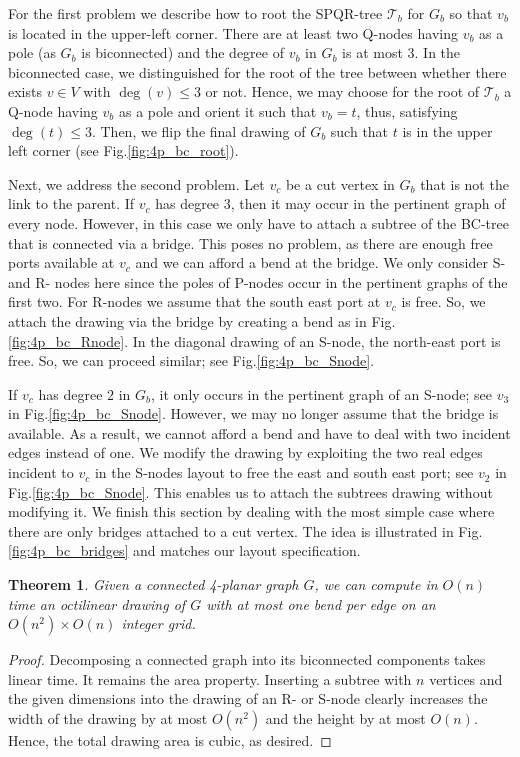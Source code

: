 \documentclass[a4paper,twoside,11pt]{article}
\newtheorem{theorem}{Theorem}
\begin{document}
For the first problem we describe how to root the SPQR-tree
$\mathcal{T}_b$ for $G_b$ so that $v_b$ is located in the upper-left
corner. There are at least two Q-nodes having $v_b$ as a pole (as
$G_b$ is biconnected) and the degree of $v_b$ in $G_b$ is at most
$3$. In the biconnected case, we distinguished for the root of the
tree between whether there exists $v \in V$ with $\deg(v) \leq 3$ or
not. Hence, we may choose for the root of $\mathcal{T}_b$ a Q-node
having $v_b$ as a pole and orient it such that $v_b = t$, thus,
satisfying $\deg(t) \leq 3$. Then, we flip the final drawing of
$G_b$ such that $t$ is in the upper left corner (see
Fig.\ref{fig:4p_bc_root}).

Next, we address the second problem. Let $v_c$ be a cut vertex in
$G_b$ that is not the link to the parent. If $v_c$ has degree $3$,
then it may occur in the pertinent graph of every node. However, in
this case we only have to attach a subtree of the BC-tree that is
connected via a bridge. This poses no problem, as there are enough
free ports available at $v_c$ and we can afford a bend at the
bridge. We only consider S- and R- nodes here since the poles of
P-nodes occur in the pertinent graphs of the first two. For R-nodes
we assume that the south east port at $v_c$ is free. So, we attach
the drawing via the bridge by creating a bend as in
Fig.\ref{fig:4p_bc_Rnode}. In the diagonal drawing of an S-node, the
north-east port is free. So, we can proceed similar; see
Fig.\ref{fig:4p_bc_Snode}.

If $v_c$ has degree $2$ in $G_b$, it only occurs in the pertinent
graph of an S-node; see $v_3$ in Fig.\ref{fig:4p_bc_Snode}. However,
we may no longer assume that the bridge is available. As a result,
we cannot afford a bend and have to deal with two incident edges
instead of one. We modify the drawing by exploiting the two real
edges incident to $v_c$ in the S-nodes layout to free the east and
south east port; see $v_2$ in Fig.\ref{fig:4p_bc_Snode}. This
enables us to attach the subtrees drawing without modifying it. We
finish this section by dealing with the most simple case where there
are only bridges attached to a cut vertex. The idea is illustrated
in Fig.\ref{fig:4p_bc_bridges} and matches our layout specification.

\begin{theorem}
Given a connected 4-planar graph $G$, we can compute in $O(n)$ time
an octilinear drawing of $G$ with at most one bend per edge on an
$O(n^2) \times O(n)$ integer grid. \label{thm:4planarconnected}
\end{theorem}
\begin{proof}
Decomposing a connected graph into its biconnected components takes
linear time. It remains the area property. Inserting a subtree with
$n$ vertices and the given dimensions into the drawing of an R- or
S-node clearly increases the width of the drawing by at most
$O(n^2)$ and the height by at most $O(n)$. Hence, the total drawing
area is cubic, as desired.
\end{proof}
\end{document}

